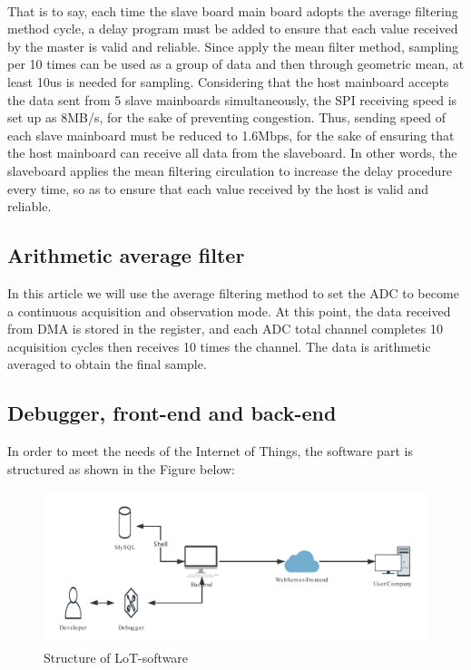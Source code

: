 \\
That is to say, each time the slave board main board adopts the average filtering method cycle, a delay program must be added to ensure that each value received by the master is valid and reliable.
Since apply the mean filter method, sampling per 10 times can be used as a group of data and then through geometric mean, at least 10us is needed for sampling. 
Considering that the host mainboard accepts the data sent from 5 slave mainboards simultaneously, the SPI receiving speed is set up as 8MB/s, for the sake of preventing congestion. 
Thus, sending speed of each slave mainboard must be reduced to 1.6Mbps, for the sake of ensuring that the host mainboard can receive all data from the slaveboard. 
In other words, the slaveboard applies the mean filtering circulation to increase the delay procedure every time, so as to ensure that each value received by the host is valid and reliable. 

\subsection{Arithmetic average filter}
\label{sec:Arithmetic average filter}

In this article we will use the average filtering method to set the ADC to become a continuous acquisition and observation mode. At this point, the data received from DMA is stored in the register, and each ADC total channel completes 10 acquisition cycles then receives 10 times the channel. The data is arithmetic averaged to obtain the final sample.

\subsection{Debugger, front-end and back-end}
\label{sec:Debugger, front-end and back-end}

In order to meet the needs of the Internet of Things, the software part is structured as shown in the Figure below:
\begin{figure}[!ht]
	\centering
	\includegraphics[width=16cm]{grafiken/5.7.pdf}
	\caption{Structure of LoT-software} 
	\label{fig:5.7}
\end{figure}
\FloatBarrier



